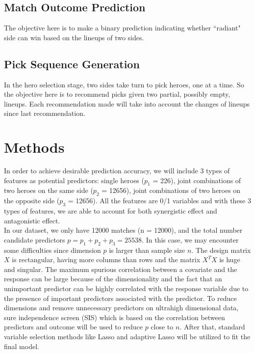 \documentclass[11pt]{article}
\begin{document}
\subsection{Match Outcome Prediction}
The objective here is to make a binary prediction indicating whether ``radiant" side can win based on the lineups of two sides.

\subsection{Pick Sequence Generation}
In the hero selection stage, two sides take turn to pick heroes, one at a time. So the objective here is to recommend picks given two partial, possibly empty, lineups. Each recommendation made will take into account the changes of lineups since last recommendation.

\section{Methods}
In order to achieve desirable prediction accuracy, we will include 3 types of features as potential predictors: single heroes ($p_1$ = 226), joint combinations of two heroes on the same side ($p_2$ = 12656), joint combinations of two heroes on the opposite side ($p_3$ = 12656). All the features are 0/1 variables and with these 3 types of features, we are able to account for both synergistic effect and antagonistic effect.\\ 

\noindent In our dataset, we only have 12000 matches (n = 12000), and the total number candidate predictors $p = p_1 + p_2 + p_3 = 25538$. In this case, we may encounter some difficulties since dimension $p$ is larger than sample size $n$. The design matrix $X$ is rectangular, having more columns than rows and the matrix $X^TX$ is huge and singular. The maximum spurious correlation between a covariate and the response can be large because of the dimensionality and the fact that an unimportant predictor can be highly correlated with the response variable due to the presence of important predictors associated with the predictor. To reduce dimensions and remove unnecessary predictors on ultrahigh dimensional data, sure independence screen (SIS) which is based on the correlation between predictors and outcome \cite{SIS} will be used to reduce $p$ close to $n$. After that, standard variable selection methods like Lasso\cite{lasso} and adaptive Lasso\cite{adalasso} will be utilized to fit the final model. \\
\end{document}
